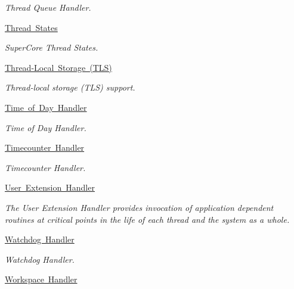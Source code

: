\begin{DoxyCompactItemize}
\begin{DoxyCompactList}\small\item\em Thread Queue Handler. \end{DoxyCompactList}\item 
\mbox{\hyperlink{group__RTEMSScoreStates}{Thread States}}
\begin{DoxyCompactList}\small\item\em Super\+Core Thread States. \end{DoxyCompactList}\item 
\mbox{\hyperlink{group__RTEMSScoreTLS}{Thread-\/\+Local Storage (\+T\+L\+S)}}
\begin{DoxyCompactList}\small\item\em Thread-\/local storage (T\+LS) support. \end{DoxyCompactList}\item 
\mbox{\hyperlink{group__RTEMSScoreTOD}{Time of Day Handler}}
\begin{DoxyCompactList}\small\item\em Time of Day Handler. \end{DoxyCompactList}\item 
\mbox{\hyperlink{group__RTEMSScoreTimecounter}{Timecounter Handler}}
\begin{DoxyCompactList}\small\item\em Timecounter Handler. \end{DoxyCompactList}\item 
\mbox{\hyperlink{group__RTEMSScoreUserExt}{User Extension Handler}}
\begin{DoxyCompactList}\small\item\em The User Extension Handler provides invocation of application dependent routines at critical points in the life of each thread and the system as a whole. \end{DoxyCompactList}\item 
\mbox{\hyperlink{group__RTEMSScoreWatchdog}{Watchdog Handler}}
\begin{DoxyCompactList}\small\item\em Watchdog Handler. \end{DoxyCompactList}\item 
\mbox{\hyperlink{group__RTEMSScoreWorkspace}{Workspace Handler}}
\end{DoxyCompactItemize}
